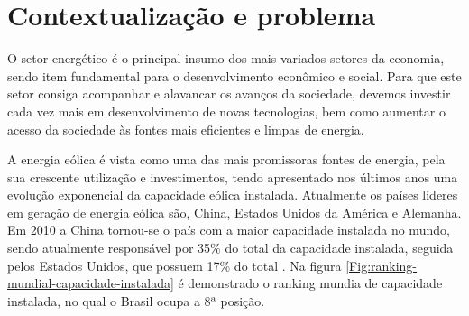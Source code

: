 
\label{Cap:fundamentacao}

\section{Contextualização e problema}
\label{contextualização}







O setor energético é o principal insumo dos mais variados setores da economia, sendo item fundamental para o desenvolvimento econômico e social. Para que este setor consiga acompanhar e alavancar os avanços da sociedade, devemos investir cada vez mais em desenvolvimento de novas tecnologias, bem como aumentar o acesso da sociedade às fontes mais eficientes e limpas de energia.

A energia eólica é vista como uma das mais promissoras fontes de energia, pela sua crescente utilização e investimentos, tendo apresentado nos últimos anos uma evolução exponencial da capacidade eólica instalada. Atualmente os países lideres em geração de energia eólica são, China, Estados Unidos da América e Alemanha. Em 2010 a China tornou-se o país com a maior capacidade instalada no mundo, sendo atualmente responsável por 35\% do total da capacidade instalada, seguida pelos Estados Unidos, que possuem 17\% do total \cite{global-wind-energy}. Na figura \ref{Fig:ranking-mundial-capacidade-instalada} é demonstrado o ranking mundia de capacidade instalada, no qual o Brasil ocupa a 8ª posição.

